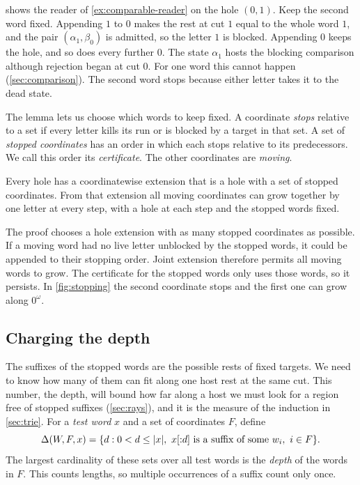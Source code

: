  shows the reader of \cref{ex:comparable-reader} on the
hole $(0,1)$. Keep the second word fixed. Appending $1$ to $0$ makes the
rest at cut $1$ equal to the whole word $1$, and the pair
$(\alpha_1,\beta_0)$ is admitted, so the letter $1$ is blocked. Appending
$0$ keeps the hole, and so does every further $0$. The state $\alpha_1$
hosts the blocking comparison although rejection began at cut $0$. For one
word this cannot happen (\cref{sec:comparison}). The second word stops
because either letter takes it to the dead state.

The lemma lets us choose which words to keep fixed. A coordinate
\emph{stops} relative to a set if every letter kills its run or is
blocked by a target in that set. A set of \emph{stopped coordinates}
has an order in which each stops relative to its predecessors. We call
this order its \emph{certificate}. The other coordinates are
\emph{moving}.

\begin{lemma}[Stopping]\label{lem:stopping}
Every hole has a coordinatewise extension that is a hole with a set
of stopped coordinates. From that extension all moving coordinates
can grow together by one letter at every step, with a hole at each
step and the stopped words fixed.
\end{lemma}

The proof chooses a hole extension with as many stopped coordinates as
possible. If a moving word had no live letter unblocked by the stopped
words, it could be appended to their stopping order. Joint extension
therefore permits all moving words to grow. The certificate for the
stopped words only uses those words, so it persists. In
\cref{fig:stopping} the second coordinate stops and the first one can
grow along $0^\omega$.

\subsection{Charging the depth}

The suffixes of the stopped words are the possible rests of fixed targets.
We need to know how many of them can fit along one host rest at the same
cut. This number, the depth, will bound how far along a host we must look
for a region free of stopped suffixes (\cref{sec:rays}), and it is the
measure of the induction in \cref{sec:trie}. For a \emph{test word} $x$ and a set of coordinates
$F$, define
\[
 \Delta(W,F,x)=
 \{d:0<d\le\lvert x\rvert,\ x[{:}d]\text{ is a suffix of some }w_i,\ i\in F\}.
\]
The largest cardinality of these sets over all test words is the
\emph{depth} of the words in $F$. This counts lengths, so multiple
occurrences of a suffix count only once.

